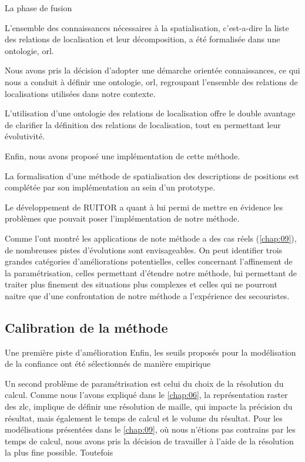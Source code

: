La phase de fusion

L'ensemble des connaissances nécessaires à la spatialisation,
c'est-a-dire la liste des relations de localisation et leur
décomposition, a été formalisée dans une ontologie, \ac{orl}.



Nous avons pris la décision d'adopter une démarche orientée
connaissances, ce qui nous a conduit à définir une ontologie,
\ac{orl}, regroupant l'ensemble des relations de localisations
utilisées dans notre contexte.

L'utilisation d'une ontologie des relations de localisation offre le
double avantage de clarifier la définition des relations de
localisation, tout en permettant leur évolutivité.


Enfin, nous avons proposé une implémentation de cette méthode.

La formalisation d'une méthode de spatialisation des descriptions de
positions est complétée par son implémentation au sein d'un prototype.




Le développement de RUITOR a quant à lui permi de mettre en évidence
les problèmes que pouvait poser l'implémentation de notre méthode.


Comme l'ont montré les applications de note méthode a des cas réels
(\autoref{chap:09}), de nombreuses pistes d'évolutions sont
envisageables. On peut identifier trois grandes catégories
d'améliorations potentielles, celles concernant l'affinement de la
paramétrisation, celles permettant d'étendre notre méthode, lui
permettant de traiter plus finement des situations plus complexes et
celles qui ne pourront naitre que d'une confrontation de notre méthode
a l'expérience des secouristes.

\subsection*{Calibration de la méthode}

Une première piste d'amélioration
Enfin, les seuils proposés pour la modélisation de la confiance ont
été sélectionnés de manière empirique


Un second problème de paramétrisation est celui du choix de la
résolution du calcul. Comme nous l'avons expliqué dans le
\autoref{chap:06}, la représentation raster des \ac{zlc}, implique de
définir une résolution de maille, qui impacte la précision du
résultat, mais également le temps de calcul et le volume du
résultat. Pour les modélisations présentées dans le \autoref{chap:09},
où nous n'étions pas contrains par les temps de calcul, nous avons
pris la décision de travailler à l'aide de la résolution la plus fine
possible. Toutefois


